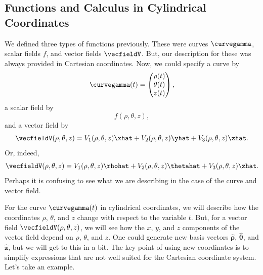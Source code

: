 \subsection{Functions and Calculus in Cylindrical Coordinates}

We defined three types of functions previously.  These were curves $\curvegamma$, scalar fields $f$, and vector fields $\vecfieldV$.  But, our description for these was always provided in Cartesian coordinates.  Now, we could specify a curve by
\[
\curvegamma(t) = \begin{pmatrix} \rho(t) \\ \theta(t) \\ z(t) \end{pmatrix},
\]
a scalar field by
\[
f(\rho,\theta,z),
\]
and a vector field by
\[
\vecfieldV(\rho,\theta,z) =  V_1(\rho,\theta,z)\xhat + V_2(\rho,\theta,z)\yhat + V_3(\rho,\theta,z)\zhat.
\]
Or, indeed,
\[
\vecfieldV(\rho,\theta,z) = V_1(\rho,\theta,z) \rhohat + V_2(\rho,\theta,z) \thetahat + V_3(\rho,\theta,z)\zhat.
\]
Perhaps it is confusing to see what we are describing in the case of the curve and vector field.  

For the curve $\curvegamma(t)$ in cylindrical coordinates, we will describe how the coordinates $\rho$, $\theta$, and $z$ change with respect to the variable $t$.  But, for a vector field $\vecfieldV(\rho,\theta,z)$, we will see how the $x$, $y$, and $z$ components of the vector field depend on $\rho$, $\theta$, and $z$.  One could generate new basis vectors $\boldsymbol{\hat{\rho}}$, $\boldsymbol{\hat{\theta}}$, and $\boldsymbol{\hat{z}}$, but we will get to this in a bit. The key point of using new coordinates is to simplify expressions that are not well suited for the Cartesian coordinate system.  Let's take an example.

